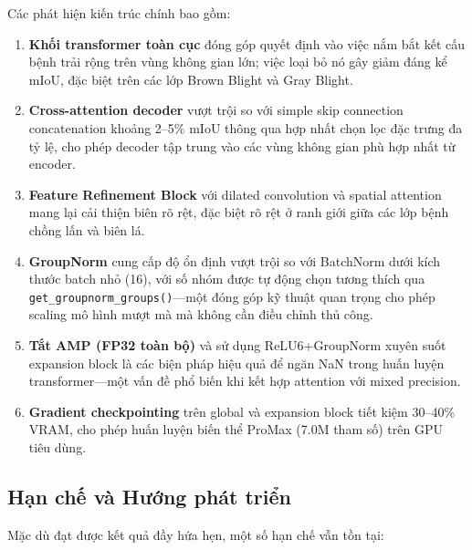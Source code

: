 \documentclass[conference]{IEEEtran}
\begin{document}
Các phát hiện kiến trúc chính bao gồm:

\begin{enumerate}
    \item \textbf{Khối transformer toàn cục} đóng góp quyết định vào việc nắm bắt kết cấu bệnh trải rộng trên vùng không gian lớn; việc loại bỏ nó gây giảm đáng kể mIoU, đặc biệt trên các lớp Brown Blight và Gray Blight.

    \item \textbf{Cross-attention decoder} vượt trội so với simple skip connection concatenation khoảng 2--5\% mIoU thông qua hợp nhất chọn lọc đặc trưng đa tỷ lệ, cho phép decoder tập trung vào các vùng không gian phù hợp nhất từ encoder.

    \item \textbf{Feature Refinement Block} với dilated convolution và spatial attention mang lại cải thiện biên rõ rệt, đặc biệt rõ rệt ở ranh giới giữa các lớp bệnh chồng lấn và biên lá.

    \item \textbf{GroupNorm} cung cấp độ ổn định vượt trội so với BatchNorm dưới kích thước batch nhỏ (16), với số nhóm được tự động chọn tương thích qua \texttt{get\_groupnorm\_groups()}---một đóng góp kỹ thuật quan trọng cho phép scaling mô hình mượt mà mà không cần điều chỉnh thủ công.

    \item \textbf{Tắt AMP (FP32 toàn bộ)} và sử dụng ReLU6+GroupNorm xuyên suốt expansion block là các biện pháp hiệu quả để ngăn NaN trong huấn luyện transformer---một vấn đề phổ biến khi kết hợp attention với mixed precision.

    \item \textbf{Gradient checkpointing} trên global và expansion block tiết kiệm 30--40\% VRAM, cho phép huấn luyện biến thể ProMax (7.0M tham số) trên GPU tiêu dùng.
\end{enumerate}

\subsection{Hạn chế và Hướng phát triển}

Mặc dù đạt được kết quả đầy hứa hẹn, một số hạn chế vẫn tồn tại:
\end{document}
